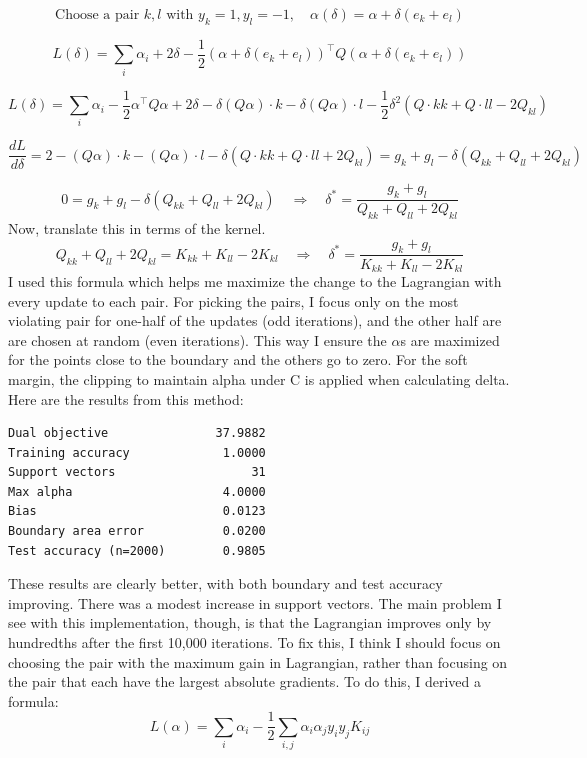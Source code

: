 \documentclass[11pt]{article}
\theoremstyle{mystyle}
\begin{document}
\[
\text{Choose a pair } k,l \text{ with } y_k = 1, y_l = -1, \quad \alpha(\delta) = \alpha + \delta (e_k + e_l)
\]

\[
L(\delta) = \sum_i \alpha_i + 2\delta - \frac{1}{2} (\alpha + \delta(e_k+e_l))^\top Q (\alpha + \delta(e_k+e_l))
\]

\[
L(\delta) = \sum_i \alpha_i - \frac{1}{2} \alpha^\top Q \alpha + 2\delta - \delta (Q\alpha)\cdot k - \delta (Q\alpha)\cdot l - \frac{1}{2} \delta^2 (Q\cdot {kk} + Q\cdot {ll} - 2Q_{kl})
\]

\[
\frac{d L}{d\delta} = 2 - (Q\alpha)\cdot k - (Q\alpha)\cdot l - \delta (Q\cdot {kk}+Q\cdot {ll}+2Q_{kl}) = g_k + g_l - \delta (Q_{kk}+Q_{ll}+2Q_{kl})
\]

\[
0 = g_k + g_l - \delta (Q_{kk}+Q_{ll}+2Q_{kl}) \quad \Rightarrow \quad \delta^* = \frac{g_k + g_l}{Q_{kk}+Q_{ll}+2Q_{kl}}
\]
\noindent Now, translate this in terms of the kernel.
\[
Q_{kk} + Q_{ll} + 2 Q_{kl} = K_{kk} + K_{ll} - 2 K_{kl} \quad \Rightarrow \quad \delta^* = \frac{g_k + g_l}{K_{kk} + K_{ll} - 2 K_{kl}}
\]
I used this formula which helps me maximize the change to the Lagrangian with every update to each pair. For picking the pairs, I focus only on the most violating pair for one-half of the updates (odd iterations), and the other half are are chosen at random (even iterations). This way I ensure the $\alpha$s are maximized for the points close to the boundary and the others go to zero. For the soft margin, the clipping to maintain alpha under C is applied when calculating delta. Here are the results from this method:
 \begin{verbatim}                     
Dual objective               37.9882
Training accuracy             1.0000
Support vectors                   31
Max alpha                     4.0000
Bias                          0.0123
Boundary area error           0.0200
Test accuracy (n=2000)        0.9805
\end{verbatim}
These results are clearly better, with both boundary and test accuracy improving. There was a modest increase in support vectors. The main problem I see with this implementation, though, is that the Lagrangian improves only by hundredths after the first 10,000 iterations. To fix this, I think I should focus on choosing the pair with the maximum gain in Lagrangian, rather than focusing on the pair that each have the largest absolute gradients. To do this, I derived a formula:
\[
L(\alpha)=\sum_i \alpha_i-\frac12\sum_{i,j}\alpha_i\alpha_j y_i y_j K_{ij}
\]
\end{document}
